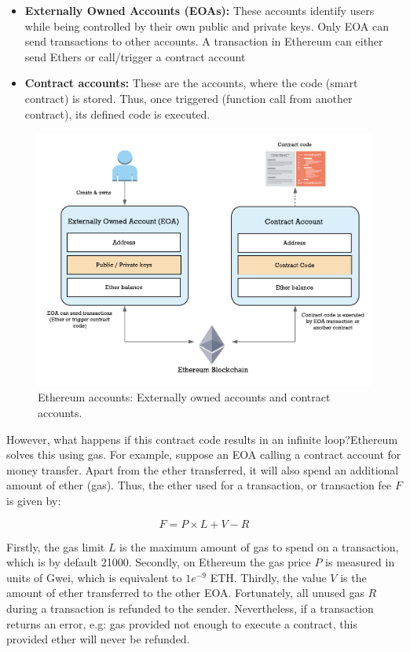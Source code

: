 \begin{itemize}
	
	\item \textbf{Externally Owned Accounts (EOAs):} These accounts identify users while being controlled by their own public and private keys. Only EOA can send transactions to other accounts. A transaction in Ethereum can either send Ethers or call/trigger a contract account  
	\item \textbf{Contract accounts:} These are the accounts, where the code (smart contract) is stored. Thus, once triggered (function call from another contract), its defined code is executed.
\end{itemize}

\begin{figure}[bth]
  \centering
  \includegraphics[width=0.6\linewidth]{gfx/ethereumAccounts}    
  \caption{Ethereum accounts: Externally owned accounts and contract 			accounts.}
  \label{fig:EthereumAccounts}
\end{figure}

However, what happens if this contract code results in an infinite loop?Ethereum solves this using gas. For example, suppose an EOA calling a contract account for money transfer. Apart from the ether transferred, it will also spend an additional amount of ether (gas). Thus, the ether used for a transaction, or transaction fee $F$ is given by:

\begin{equation}
	F = P \times L + V - R
\end{equation}

Firstly, the gas limit $L$ is the maximum amount of gas to spend on a transaction, which is by default 21000. Secondly, on Ethereum the gas price $P$ is measured in units of Gwei, which is equivalent to $1e^{-9}$ ETH. Thirdly, the value $V$ is the amount of ether transferred to the other EOA. Fortunately, all unused gas $R$ during a transaction is refunded to the sender. Nevertheless, if a transaction returns an error, e.g: gas provided not enough to execute a contract, this provided ether will never be refunded. 

